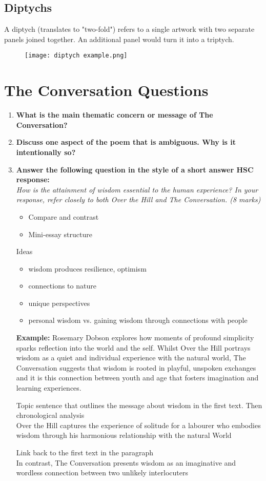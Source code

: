 		\newpage

	\subsection{Diptychs}
		A diptych (translates to "two-fold") refers to a single artwork with two separate panels joined together. An additional panel would turn it into a triptych.
		\begin{figure}[H]
			\centering
			\texttt{[image: diptych example.png]}
		\end{figure}

\section{The Conversation Questions} \label{20/11/2024}
	\begin{enumerate}
		\item \textbf{What is the main thematic concern or message of The Conversation?}
		\item \textbf{Discuss one aspect of the poem that is ambiguous. Why is it intentionally so?}
		\item \textbf{Answer the following question in the style of a short answer HSC response:} \\
		\textit{How is the attainment of wisdom essential to the human experience? In your response, refer closely to both Over the Hill and The Conversation. (8 marks)}
		\begin{itemize}
			\item Compare and contrast
			\item Mini-essay structure
		\end{itemize}
		Ideas
		\begin{itemize}
			\item wisdom produces resilience, optimism
			\item connections to nature
			\item unique perspectives
			\item personal wisdom vs. gaining wisdom through connections with people
		\end{itemize}

		\subitem \textbf{Example:} Rosemary Dobson explores how moments of profound simplicity sparks reflection into the world and the self. Whilst Over the Hill portrays wisdom as a quiet and individual experience with the natural world, The Conversation suggests that wisdom is rooted in playful, unspoken exchanges and it is this connection between youth and age that fosters imagination and learning experiences.

		\subitem Topic sentence that outlines the message about wisdom in the first text. Then chronological analysis \\
			Over the Hill captures the experience of solitude for a labourer who embodies wisdom through his harmonious relationship with the natural World

		\subitem Link back to the first text in the paragraph \\
			In contrast, The Conversation presents wisdom as an imaginative and wordless connection between two unlikely interlocuters 
	\end{enumerate}

